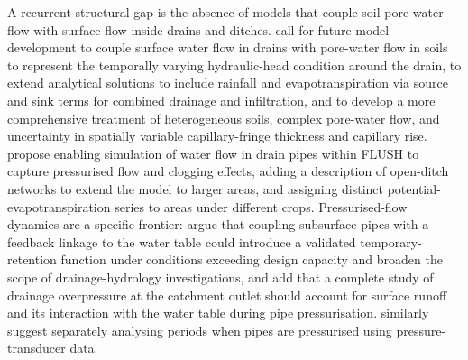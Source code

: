 A recurrent structural gap is the absence of models that couple soil
pore-water flow with surface flow inside drains and ditches.
\textcite{Xin2016b} call for future model development to couple surface water
flow in drains with pore-water flow in soils to represent the temporally
varying hydraulic-head condition around the drain, to extend analytical
solutions to include rainfall and evapotranspiration via source and sink terms
for combined drainage and infiltration, and to develop a more comprehensive
treatment of heterogeneous soils, complex pore-water flow, and uncertainty in
spatially variable capillary-fringe thickness and capillary rise.
\textcite{Nousiainen2015} propose enabling simulation of water flow in drain
pipes within FLUSH to capture pressurised flow and clogging effects, adding a
description of open-ditch networks to extend the model to larger areas, and
assigning distinct potential-evapotranspiration series to areas under
different crops. Pressurised-flow dynamics are a specific frontier:
\textcite{Henine2010} argue that coupling subsurface pipes with a feedback
linkage to the water table could introduce a validated temporary-retention
function under conditions exceeding design capacity and broaden the scope of
drainage-hydrology investigations, and \textcite{Henine2014} add that a
complete study of drainage overpressure at the catchment outlet should account
for surface runoff and its interaction with the water table during pipe
pressurisation. \textcite{Saadat2018} similarly suggest separately analysing
periods when pipes are pressurised using pressure-transducer data.

